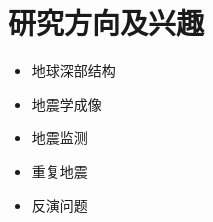 \section*{研究方向及兴趣}

\begin{itemize}
\item 地球深部结构
\item 地震学成像
\item 地震监测
\item 重复地震
\item 反演问题
\end{itemize}
